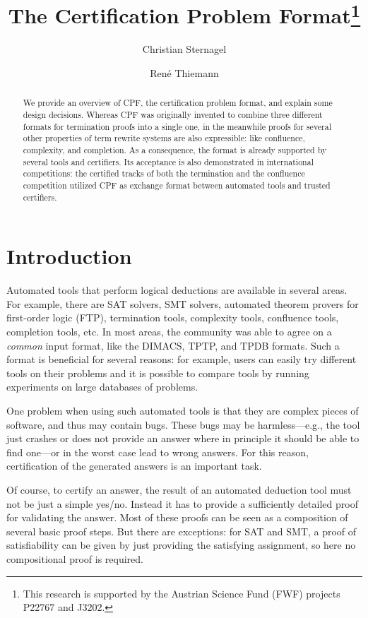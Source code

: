 \documentclass[USenglish]{eptcs}
\title{The Certification Problem Format\footnote{This research is supported by the Austrian Science Fund (FWF) projects P22767
  and J3202.}}
\author{Christian Sternagel 
\institute{University of Innsbruck, Austria}
\email{christian.sternagel@uibk.ac.at}\and 
Ren{\'e} Thiemann
\institute{University of Innsbruck, Austria}
\email{rene.thiemann@uibk.ac.at}}
\begin{document}
\maketitle

\begin{abstract}
We provide an overview of CPF, the certification problem format, and explain some design decisions.
Whereas CPF was originally invented
to combine three different formats for termination proofs into a single 
one, in the meanwhile proofs for several other properties of term rewrite systems are
also expressible: like confluence, complexity, and completion. As a consequence, 
the format is already supported by several tools and certifiers. Its acceptance is also demonstrated
in international competitions: the certified tracks of both the termination and the 
confluence competition utilized CPF as exchange format between automated tools and 
trusted certifiers. 
\end{abstract}

\section{Introduction}

Automated tools that perform logical deductions are available in several areas.
For example,
there are SAT solvers, SMT solvers, automated theorem provers for first-order
logic (FTP), termination tools, complexity tools, confluence tools, completion tools, etc.
In most areas, the community was able to agree on a \emph{common} input format,
like the DIMACS, TPTP, and TPDB formats. Such a format is beneficial for
several reasons: for example, users can easily try different
tools on their problems and it is possible to compare tools by 
running experiments on large databases of problems. 

One problem when using such automated tools is that they are
complex pieces of software, and thus may contain bugs. These bugs may be
harmless---e.g., the tool just crashes or does not provide an answer where in principle
it should be able to find one---or in the worst case
lead to wrong answers. For this reason, certification of the generated answers
is an important task. 

Of course, to certify an answer, the result of an automated deduction tool must
not be just a simple yes/no. Instead it has to provide a sufficiently
detailed proof for validating the answer.  Most of these proofs
can be seen as a composition of several basic proof steps. But there are
exceptions: for SAT and SMT, a proof of satisfiability can be given by just 
providing the satisfying assignment, so here no compositional proof is required.
\end{document}
